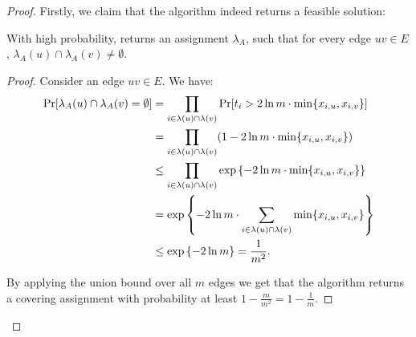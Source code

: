 \begin{proof}
Firstly, we claim that the algorithm indeed returns a feasible solution:
    \begin{lemma}
With high probability,  returns an assignment $\lambda_A$, such that for every edge $uv \in E$, $\lambda_A(u) \cap \lambda_A(v) \neq \emptyset$.
    \end{lemma}
\begin{proof}
    Consider an edge $uv\in E$. We have:
\begin{align*}
    \Pr\mathopen{}\left[ \lambda_A\mathopen{}\left( u \right)\cap\lambda_A\mathopen{}\left( v \right)=\emptyset \right] & = \prod_{i\in\lambda\mathopen{}\left( u \right)\cap\lambda\mathopen{}\left( v \right)}\Pr\mathopen{}\left[ t_i > 2\ln m \cdot \min\mathopen{}\left\{ x_{i, u}, x_{i, v} \right\} \right]\\
    & = \prod_{i\in\lambda\mathopen{}\left( u \right)\cap\lambda\mathopen{}\left( v \right)}\mathopen{}\left( 1-2\ln m \cdot\min\mathopen{}\left\{ x_{i, u}, x_{i, v} \right\} \right)\\&
    \leq \prod_{i\in\lambda\mathopen{}\left( u \right)\cap\lambda\mathopen{}\left( v \right)}\exp\left\{ -2\ln m \cdot\min\mathopen{}\left\{ x_{i, u}, x_{i, v} \right\} \right\} 
    \\& = \exp\left\{ -2\ln m \cdot\sum_{i\in\lambda\mathopen{}\left( u \right)\cap\lambda\mathopen{}\left( v \right)}\min\mathopen{}\left\{ x_{i, u}, x_{i, v} \right\} \right\}\\
    & \leq \exp\left\{ -2\ln m \right\} = \frac{1}{m^2}.
\end{align*}

By applying the union bound over all $m$ edges we get that the algorithm returns a covering assignment with probability at least $1-\frac{m}{m^2} = 1-\frac{1}{m}$.
\end{proof}


\end{proof}

